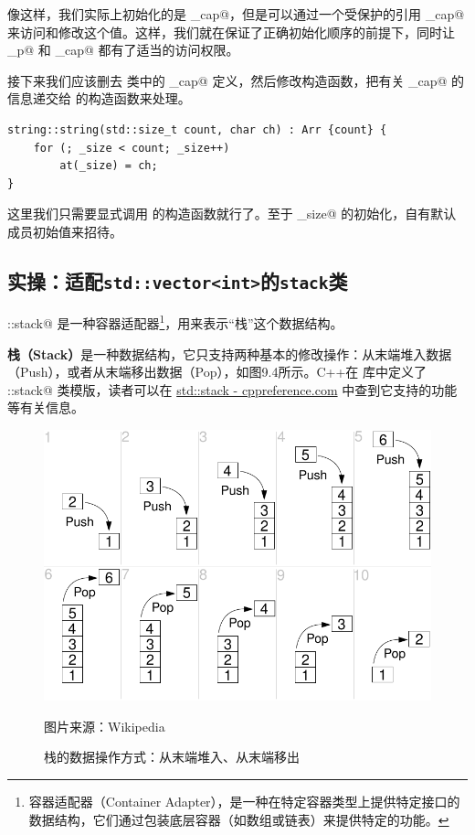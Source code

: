 像这样，我们实际上初始化的是 \lstinline@ori_cap@，但是可以通过一个受保护的引用 \lstinline@_cap@ 来访问和修改这个值。这样，我们就在保证了正确初始化顺序的前提下，同时让 \lstinline@_p@ 和 \lstinline@_cap@ 都有了适当的访问权限。\par
接下来我们应该删去 \lstinline@string@ 类中的 \lstinline@_cap@ 定义，然后修改构造函数，把有关 \lstinline@_cap@ 的信息递交给 \lstinline@Arr@ 的构造函数来处理。
\begin{lstlisting}
string::string(std::size_t count, char ch) : Arr {count} {
    for (; _size < count; _size++)
        at(_size) = ch;
}
\end{lstlisting}
这里我们只需要显式调用 \lstinline@Arr@ 的构造函数就行了。至于 \lstinline@_size@ 的初始化，自有默认成员初始值来招待。\par
\subsection*{实操：适配\texttt{std::vector<int>}的\texttt{stack}类}
\lstinline@std::stack@ 是一种容器适配器\footnote{容器适配器（Container Adapter），是一种在特定容器类型上提供特定接口的数据结构，它们通过包装底层容器（如数组或链表）来提供特定的功能。}，用来表示``栈''这个数据结构。\par
\textbf{栈（Stack）}是一种数据结构，它只支持两种基本的修改操作：从末端堆入数据（Push），或者从末端移出数据（Pop），如图9.4所示。C++在 \lstinline@stack@ 库中定义了 \lstinline@std::stack@ 类模版，读者可以在 \href{https://en.cppreference.com/w/cpp/container/stack}{std::stack - cppreference.com} 中查到它支持的功能等有关信息。
\begin{figure}[htbp]
    \centering
    \includegraphics[width=.75\textwidth]{../images/generalized_parts/09_lifo_stack.png}
    \caption{栈的数据操作方式：从末端堆入、从末端移出}
    \footnotesize{图片来源：Wikipedia}
\end{figure}
